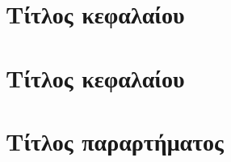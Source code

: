 \documentclass{uowmthesis}
\begin{document}












% 









\listoftables
\listoffigures
\listofalgorithms
\listofimages

\tableofcontents



\listofacronyms


\chapter{Τίτλος κεφαλαίου}



\chapter{Τίτλος κεφαλαίου}

% 


\appendix
\chapter{Τίτλος παραρτήματος}




\end{document}
